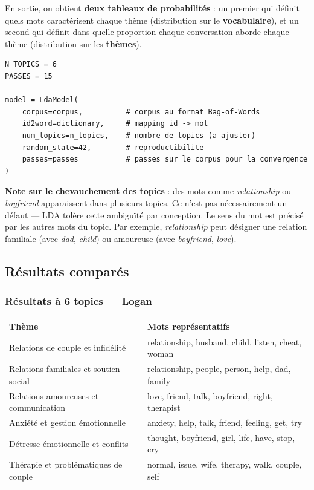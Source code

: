 \documentclass[12pt,a4paper]{article}
\begin{document}
En sortie, on obtient \textbf{deux tableaux de probabilités} : un premier qui définit quels mots caractérisent chaque thème (distribution sur le \textbf{vocabulaire}), et un second qui définit dans quelle proportion chaque conversation aborde chaque thème (distribution sur les \textbf{thèmes}).

\begin{lstlisting}
N_TOPICS = 6
PASSES = 15

model = LdaModel(
    corpus=corpus,          # corpus au format Bag-of-Words
    id2word=dictionary,     # mapping id -> mot
    num_topics=n_topics,    # nombre de topics (a ajuster)
    random_state=42,        # reproductibilite
    passes=passes           # passes sur le corpus pour la convergence
)
\end{lstlisting}

\begin{remarque}
\textbf{Note sur le chevauchement des topics} : des mots comme \textit{relationship} ou \textit{boyfriend} apparaissent dans plusieurs topics. Ce n'est pas nécessairement un défaut --- LDA tolère cette ambiguïté par conception. Le sens du mot est précisé par les autres mots du topic. Par exemple, \textit{relationship} peut désigner une relation familiale (avec \textit{dad}, \textit{child}) ou amoureuse (avec \textit{boyfriend}, \textit{love}).
\end{remarque}

\subsection{Résultats comparés}

\subsubsection*{Résultats à 6 topics --- Logan}

\begin{center}
\begin{tabular}{ll}
\toprule
\textbf{Thème} & \textbf{Mots représentatifs} \\
\midrule
Relations de couple et infidélité        & relationship, husband, child, listen, cheat, woman \\
Relations familiales et soutien social   & relationship, people, person, help, dad, family \\
Relations amoureuses et communication    & love, friend, talk, boyfriend, right, therapist \\
Anxiété et gestion émotionnelle          & anxiety, help, talk, friend, feeling, get, try \\
Détresse émotionnelle et conflits        & thought, boyfriend, girl, life, have, stop, cry \\
Thérapie et problématiques de couple     & normal, issue, wife, therapy, walk, couple, self \\
\bottomrule
\end{tabular}
\end{center}
\end{document}
